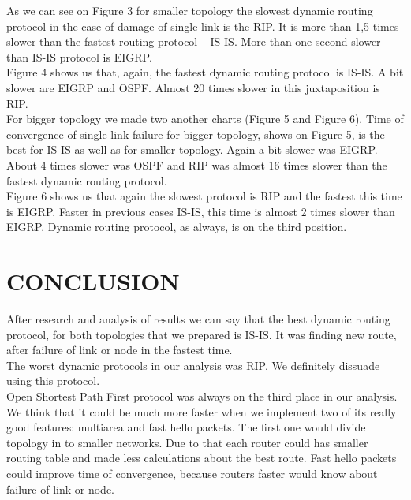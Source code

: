 \documentclass[conference,compsoc]{IEEEtran}
\begin{document}
\indent As we can see on Figure 3 for smaller topology the slowest dynamic routing protocol in the case of damage of single link is the RIP. It is more than 1,5 times slower than the fastest routing protocol – IS-IS. More than one second slower than IS-IS protocol is EIGRP.
\\ \indent Figure 4 shows us that, again, the fastest dynamic routing protocol is IS-IS. A bit slower are EIGRP and OSPF. Almost 20 times slower in this juxtaposition is RIP.
\\ \indent For bigger topology we made two another charts (Figure 5 and Figure 6). Time of convergence of single link failure for bigger topology, shows on Figure 5, is the best for IS-IS as well as for smaller topology. Again a bit slower was EIGRP. About 4 times slower was OSPF and RIP was almost 16 times slower than the fastest dynamic routing protocol.
\\ \indent Figure 6 shows us that again the slowest protocol is RIP and the fastest this time is EIGRP. Faster in previous cases IS-IS, this time is almost 2 times slower than EIGRP. Dynamic routing protocol, as always, is on the third position.

\section{CONCLUSION}
After research and analysis of results we can say that the best dynamic routing protocol, for both topologies that we prepared is IS-IS. It was finding new route, after failure of link or node in the fastest time. 
\\ \indent The worst dynamic protocols in our analysis was RIP. We definitely dissuade using this protocol.
\\ \indent Open Shortest Path First protocol was always on the third place in our analysis. We think that it could be much more faster when we implement two of its really good features: multiarea and fast hello packets. The first one would divide topology in to smaller networks. Due to that each router could has smaller routing table and made less calculations about the best route. Fast hello packets could improve time of convergence, because routers faster would know about failure of link or node.

%
\IEEEpeerreviewmaketitle
\end{document}
